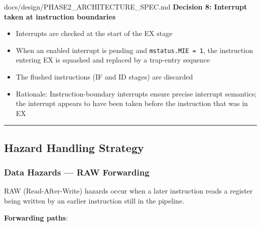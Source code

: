 \begin{relocated}{docs/design/PHASE2_ARCHITECTURE_SPEC.md}
\textbf{Decision 8: Interrupt taken at instruction boundaries}

\begin{itemize}
\tightlist
\item
  Interrupts are checked at the start of the EX stage
\item
  When an enabled interrupt is pending and
  \texttt{mstatus.\allowbreak{}MIE\ =\allowbreak{}\ 1}, the instruction
  entering EX is squashed and replaced by a trap-entry sequence
\item
  The flushed instructions (IF and ID stages) are discarded
\item
  Rationale: Instruction-boundary interrupts ensure precise interrupt
  semantics; the interrupt appears to have been taken before the
  instruction that was in EX
\end{itemize}

\begin{center}\rule{0.5\linewidth}{0.5pt}\end{center}

\subsection{Hazard Handling Strategy}\label{ds:ch:phase2-architecture:3-hazard-handling-strategy}

\subsubsection{Data Hazards --- RAW Forwarding}\label{ds:ch:phase2-architecture:31-data-hazards-raw-forwarding}

RAW (Read-After-Write) hazards occur when a later instruction reads a
register being written by an earlier instruction still in the pipeline.

\textbf{Forwarding paths}:

{\small\setlength{\tabcolsep}{4pt}

}
\end{relocated}
